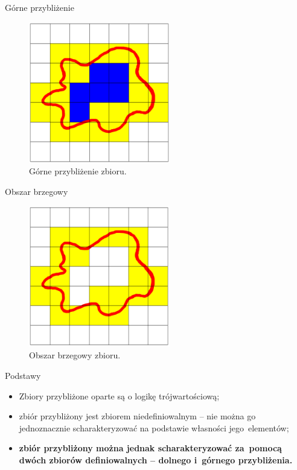 \documentclass[10pt]{beamer}
\begin{document}
\begin{frame}{Górne przybliżenie}
\begin{center}
\begin{figure}
\includegraphics[width=0.55\textwidth]{Grafiki/gorne_przyblizenie.png}
\caption{Górne przybliżenie zbioru.}
\end{figure}
\end{center}
\end{frame}


\begin{frame}{Obszar brzegowy}
\begin{center}
\begin{figure}
\includegraphics[width=0.55\textwidth]{Grafiki/obszar_brzegowy.png}
\caption{Obszar brzegowy zbioru.}
\end{figure}

\end{center}
\end{frame}



\begin{frame}{Podstawy}
\begin{spacing}{1.5}
\begin{itemize}
\item Zbiory przybliżone oparte są o logikę trójwartościową;
\item zbiór przybliżony jest zbiorem niedefiniowalnym -- nie można go jednoznacznie scharakteryzować na podstawie własności jego~elementów;
\item \textbf{zbiór przybliżony można jednak scharakteryzować za~pomocą dwóch zbiorów definiowalnych -- dolnego i~górnego przybliżenia.}
\end{itemize}

\end{spacing}
\end{frame}
\end{document}
